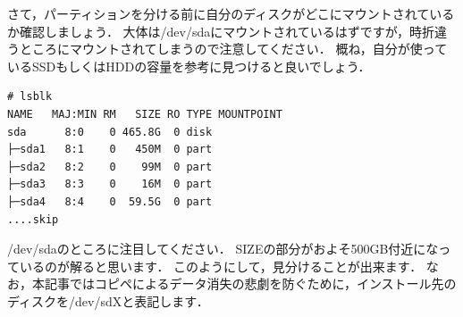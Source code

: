 \documentclass[b5j,twoside,openany]{jsbook}
\begin{document}
      \newpage
      
      さて，パーティションを分ける前に自分のディスクがどこにマウントされているか確認しましょう．
      大体は/dev/sdaにマウントされているはずですが，時折違うところにマウントされてしまうので注意してください．
      概ね，自分が使っているSSDもしくはHDDの容量を参考に見つけると良いでしょう．
      \begin{screen}
\begin{verbatim}
# lsblk
NAME   MAJ:MIN RM   SIZE RO TYPE MOUNTPOINT
sda      8:0    0 465.8G  0 disk 
├─sda1   8:1    0   450M  0 part 
├─sda2   8:2    0    99M  0 part 
├─sda3   8:3    0    16M  0 part 
├─sda4   8:4    0  59.5G  0 part 
....skip
\end{verbatim}
      \end{screen}

      /dev/sdaのところに注目してください．
      SIZEの部分がおよそ500GB付近になっているのが解ると思います．
      このようにして，見分けることが出来ます．
      なお，本記事ではコピペによるデータ消失の悲劇を防ぐために，インストール先のディスクを/dev/sdXと表記します．
\end{document}
